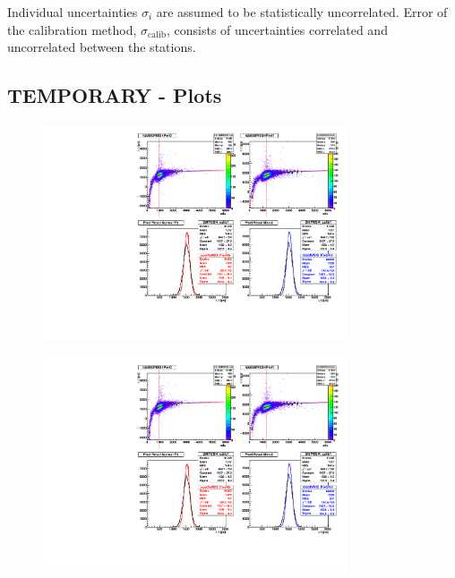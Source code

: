 Individual uncertainties $\sigma_i$ are assumed to be statistically
uncorrelated. Error of the calibration method, $\sigma_\text{calib}$,
consists of uncertainties correlated and uncorrelated between the
stations.


\subsection{TEMPORARY - Plots}

\begin{figure}
  \begin{center}
  \includegraphics[clip,trim=0 8.5cm 10cm 0, width=9cm]{01_tw_example} \\
  \caption{}
  \label{fig:TW}
  \end{center}
\end{figure}

\begin{figure}
  \begin{center}
  \includegraphics[clip,trim=0 0 10cm 8.5cm, width=9cm]{02_slab_dt_resolution_tw_effect} \\
  \caption{}
  \label{fig:SlabDTTW}
  \end{center}
\end{figure}


